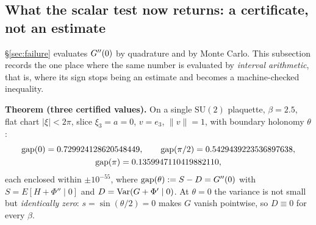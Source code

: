 \subsection{What the scalar test now returns: a certificate, not an estimate}
\label{sec:scalar-cert}

\S\ref{sec:failure} evaluates $G''(0)$ by quadrature and by Monte Carlo. This subsection records the one
place where the same number is evaluated by \emph{interval arithmetic}, that is, where its sign stops
being an estimate and becomes a machine-checked inequality.

\begin{keybox}
\textbf{Theorem (three certified values).} On a single $\mathrm{SU}(2)$ plaquette, $\beta=2.5$, flat
chart $|\xi|<2\pi$, slice $\xi_{3}=a=0$, $v=e_{3}$, $\|v\|=1$, with boundary holonomy $\theta$:
\begin{gather}
\mathrm{gap}(0)=0.729924128620548449,\qquad
\mathrm{gap}(\pi/2)=0.5429439223536897638,\notag\\
\mathrm{gap}(\pi)=0.1359947110419882110,
\label{eq:certpoints}
\end{gather}
each enclosed within $\pm10^{-55}$, where
$\mathrm{gap}(\theta):=S-D=G''(0)$ with $S=E[H+\Phi''\mid0]$ and $D=\operatorname{Var}(G+\Phi'\mid0)$. At $\theta=0$
the variance is not small but \emph{identically zero}: $s=\sin(\theta/2)=0$ makes $G$ vanish pointwise,
so $D\equiv0$ for every $\beta$. \LT
\end{keybox}

